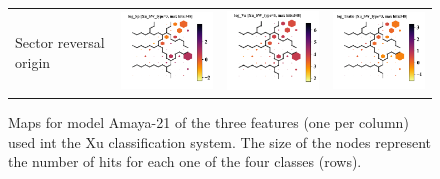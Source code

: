 \documentclass[utf8]{frontiersSCNS} %
\begin{document}
\begin{figure}[h!]
\begin{tabular}{m{2.5cm}CCC}
		Sector reversal origin & \includegraphics[width=4.5cm]{Amaya/SWtype-Xu_SW_type-3-log_Sp} &
		\includegraphics[width=4.5cm]{Amaya/SWtype-Xu_SW_type-3-log_Va} &
		\includegraphics[width=4.5cm]{Amaya/SWtype-Xu_SW_type-3-log_Tratio} \hfill	\\
	\end{tabular}
	\caption{Maps for model Amaya-21 of the three features (one per column) used int the Xu classification system. The size of the nodes represent the number of hits for each one of the four classes (rows).}\label{fig:SWtXu}
\end{figure}
\end{document}
